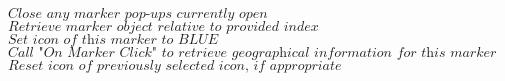 \documentclass{article}
\begin{document}
\begin{algorithm}
\begin{algorithmic}[1]
\State $\textit{Close any marker pop-ups currently open}$
\State $\textit{Retrieve marker object relative to provided index}$
\State $\textit{Set icon of this marker to BLUE}$
\State $\textit{Call "On Marker Click" to retrieve geographical information for this marker}$
\State $\textit{Reset icon of previously selected icon, if appropriate}$
\EndProcedure
\end{algorithmic}
\end{algorithm}
\end{document}

